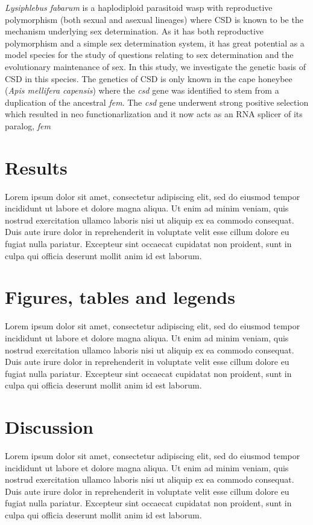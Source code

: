 \documentclass[11pt,a4paper]{report}
\begin{document}
\textit{Lysiphlebus fabarum} is a haplodiploid parasitoid wasp with reproductive polymorphism (both sexual and asexual lineages) where CSD is known to be the mechanism underlying sex determination. As it has both reproductive polymorphism and a simple sex determination system, it has great potential as a model species for the study of questions relating to sex determination and the evolutionary maintenance of sex. In this study, we investigate the genetic basis of CSD in this species. The genetics of CSD is only known in the cape honeybee (\textit{Apis mellifera capensis}) where the \textit{csd} gene was identified to stem from a duplication of the ancestral \textit{fem}. The \textit{csd} gene underwent strong positive selection which resulted in neo functionarlization and it now acts as an RNA splicer of its paralog, \textit{fem}


\section*{Results}

Lorem ipsum dolor sit amet, consectetur adipiscing elit, sed do eiusmod tempor incididunt ut labore et dolore magna aliqua. Ut enim ad minim veniam, quis nostrud exercitation ullamco laboris nisi ut aliquip ex ea commodo consequat. Duis aute irure dolor in reprehenderit in voluptate velit esse cillum dolore eu fugiat nulla pariatur. Excepteur sint occaecat cupidatat non proident, sunt in culpa qui officia deserunt mollit anim id est laborum.

\section*{Figures, tables and legends}

Lorem ipsum dolor sit amet, consectetur adipiscing elit, sed do eiusmod tempor incididunt ut labore et dolore magna aliqua. Ut enim ad minim veniam, quis nostrud exercitation ullamco laboris nisi ut aliquip ex ea commodo consequat. Duis aute irure dolor in reprehenderit in voluptate velit esse cillum dolore eu fugiat nulla pariatur. Excepteur sint occaecat cupidatat non proident, sunt in culpa qui officia deserunt mollit anim id est laborum.

\FloatBarrier

\section*{Discussion}

Lorem ipsum dolor sit amet, consectetur adipiscing elit, sed do eiusmod tempor incididunt ut labore et dolore magna aliqua. Ut enim ad minim veniam, quis nostrud exercitation ullamco laboris nisi ut aliquip ex ea commodo consequat. Duis aute irure dolor in reprehenderit in voluptate velit esse cillum dolore eu fugiat nulla pariatur. Excepteur sint occaecat cupidatat non proident, sunt in culpa qui officia deserunt mollit anim id est laborum.
\end{document}
